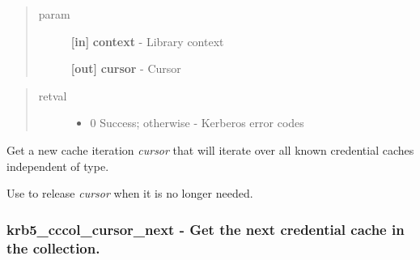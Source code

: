 \documentclass[letterpaper,10pt,english]{sphinxmanual}
\begin{document}
\begin{quote}\begin{description}
\item[{param}] \leavevmode
\textbf{{[}in{]}} \textbf{context} - Library context

\textbf{{[}out{]}} \textbf{cursor} - Cursor

\end{description}\end{quote}
\begin{quote}\begin{description}
\item[{retval}] \leavevmode\begin{itemize}
\item {} 
0   Success; otherwise - Kerberos error codes

\end{itemize}

\end{description}\end{quote}

Get a new cache iteration \emph{cursor} that will iterate over all known credential caches independent of type.

Use {\hyperref[appdev/refs/api/krb5_cccol_cursor_free:c.krb5_cccol_cursor_free]{}} to release \emph{cursor} when it is no longer needed.




{\hyperref[appdev/refs/api/krb5_cccol_cursor_next:c.krb5_cccol_cursor_next]{}}




\subsubsection{krb5\_cccol\_cursor\_next -  Get the next credential cache in the collection.}
\label{appdev/refs/api/krb5_cccol_cursor_next::doc}\label{appdev/refs/api/krb5_cccol_cursor_next:krb5-cccol-cursor-next-get-the-next-credential-cache-in-the-collection}

\begin{fulllineitems}
\label{appdev/refs/api/krb5_cccol_cursor_next:c.krb5_cccol_cursor_next}
\end{fulllineitems}
\end{document}
